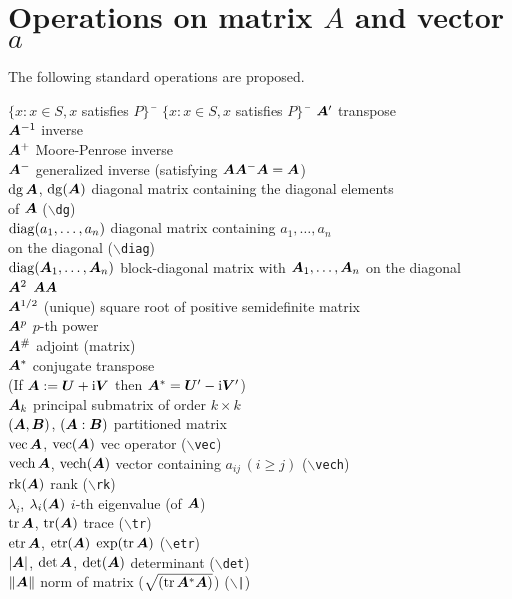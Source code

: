 \documentclass[11pt,dvips,a4paper]{article}
\newcommand{\hspacesymbols}%
   {$\{x: x \in S, x$ satisfies $P\}\;\;$} %
\newcommand{\type}[1]{{\tt$\backslash$#1}}
\begin{document}
\section{Operations on matrix $A$ and vector $a$}
The following standard operations are proposed.
\begin{tabbing}
\hspacesymbols \= \hspacesymbols\qquad\quad \=  \kill
$\bm A'$ \> transpose   \\
$\bm A^{-1}$ \> inverse   \\
$\bm A^{+}$ \> Moore-Penrose inverse   \\
$\bm A^{-}$ \> generalized inverse (satisfying $\bm A\bm A^{-}\bm A=\bm A$)   \\
$\operatorname{dg} \bm A$, $\operatorname{dg}(\bm A)$ \> diagonal matrix containing the diagonal elements \\
\> of $\bm A$ (\type{dg})   \\
$\operatorname{diag}(a_1,\dots,a_n)$ \> diagonal matrix containing $a_1,\dots,a_n$ \\
\> on the diagonal (\type{diag})  \\
$\operatorname{diag}(\bm A_1,\dots,\bm A_n)$ \> block-diagonal matrix with $\bm A_1,\dots,\bm A_n$ on
the diagonal \\
$\bm A^2$ \> $\bm A\bm A$  \\
$\bm A^{1/2}$ \> (unique) square root of positive semidefinite matrix  \\
$\bm A^p$ \> $p$-th power  \\
$\bm A^{\#}$ \> adjoint (matrix)\\
$\bm A^*$ \> conjugate transpose\\
\> (If $\bm A:=\bm U + \mathrm{i}\bm V$ then $\bm A^*=\bm U' - \mathrm{i}\bm V'$)\\
$\bm A_{k}$ \> principal submatrix of order $k\times k$\\
$(\bm A, \bm B)$, $(\bm A:\bm B)$ \> partitioned matrix   \\
$\operatorname{vec} \bm A$, $\operatorname{vec}(\bm A)$ \> vec operator (\type{vec})  \\
$\operatorname{vech} \bm A$, $\operatorname{vech}(\bm A)$ \> vector containing $a_{ij}\,(i\geq j)$ (\type{vech})\\
$\operatorname{rk}(\bm A)$ \> rank (\type{rk})   \\
$\lambda_{i}$, $\lambda_{i}(\bm A)$ \> $i$-th eigenvalue (of $\bm A$)\\
$\operatorname{tr} \bm A$, $\operatorname{tr}(\bm A)$ \> trace (\type{tr})   \\
$\operatorname{etr} \bm A$, $\operatorname{etr}(\bm A)$ \> $\exp(\operatorname{tr} \bm A)$ (\type{etr}) \\
$|\bm A|$, $\det \bm A$, $\det(\bm A)$ \> determinant (\type{det}) \\
$\|\bm A\|$ \> norm of matrix ($\sqrt{(\operatorname{tr} \bm A^*\bm A)}$) (\type{|}) \\

\end{tabbing}
\end{document}
